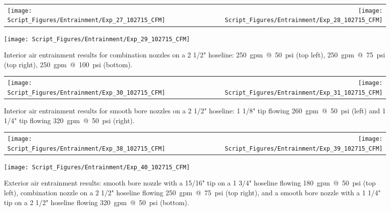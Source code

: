 \documentclass[12pt,oneside]{book}
\begin{document}
\clearpage

\begin{figure}[!ht]
\begin{tabular*}{\textwidth}{lr}
\texttt{[image: Script\_Figures/Entrainment/Exp\_27\_102715\_CFM]} &
\texttt{[image: Script\_Figures/Entrainment/Exp\_28\_102715\_CFM]} \\
\end{tabular*}
\centering
\texttt{[image: Script\_Figures/Entrainment/Exp\_29\_102715\_CFM]} 
\caption{Interior air entrainment results for combination nozzles on a 2 1/2" hoseline: 250~gpm~@~50~psi (top left), 250~gpm~@~75~psi (top right), 250~gpm~@~100~psi (bottom).}
\label{fig:2_5_Interior_Combination}
\end{figure}

\clearpage

\begin{figure}[!ht]
\begin{tabular*}{\textwidth}{lr}
\texttt{[image: Script\_Figures/Entrainment/Exp\_30\_102715\_CFM]} &
\texttt{[image: Script\_Figures/Entrainment/Exp\_31\_102715\_CFM]} \\
\end{tabular*}
\caption{Interior air entrainment results for smooth bore nozzles on a 2 1/2" hoseline: 1 1/8" tip flowing 260~gpm~@~50~psi (left) and 1 1/4" tip flowing 320~gpm~@~50~psi (right).}
\label{fig:2_5_Interior_Smooth_Bore}
\end{figure}

\clearpage

\begin{figure}[!ht]
\begin{tabular*}{\textwidth}{lr}
\texttt{[image: Script\_Figures/Entrainment/Exp\_38\_102715\_CFM]} &
\texttt{[image: Script\_Figures/Entrainment/Exp\_39\_102715\_CFM]} \\
\end{tabular*}
\centering
\texttt{[image: Script\_Figures/Entrainment/Exp\_40\_102715\_CFM]} 
\caption{Exterior air entrainment results: smooth bore nozzle with a 15/16" tip on a 1 3/4" hoseline flowing 180~gpm~@~50~psi (top left), combination nozzle on a 2 1/2" hoseline flowing 250~gpm~@~75~psi (top right), and a smooth bore nozzle with a 1 1/4" tip on a 2 1/2" hoseline flowing 320~gpm~@~50~psi (bottom).}
\label{fig:Exterior_Tests}
\end{figure}
\end{document}
